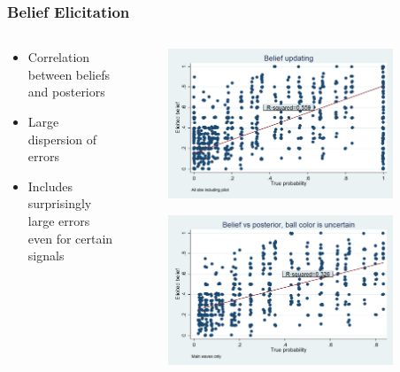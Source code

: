 \documentclass[11pt,hyperref={bookmarks=false}]{beamer}
\begin{document}
\begin{frame}
\frametitle{Belief Elicitation}
\begin{columns}
\begin{column}{0.5\textwidth}
\begin{itemize}
\item Correlation between beliefs and posteriors
\item Large dispersion of errors
\item Includes surprisingly large errors even for certain signals
\end{itemize}
\end{column}

\begin{column}{0.5\textwidth}
\begin{center}
\begin{figure}
\includegraphics[width=0.9\textwidth]{Graphs/updating_s1.png}
\end{figure}
\begin{figure}
\includegraphics[width=0.9\textwidth]{Graphs/updating_s4.png}
\end{figure}
\end{center}
\end{column}
\end{columns}
\end{frame}
\end{document}
